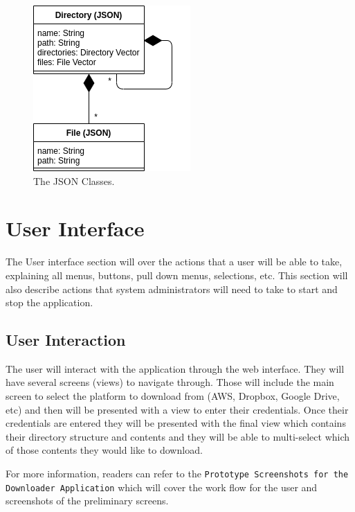 \documentclass{article}
\begin{document}
\begin{figure}[p]
\includegraphics[scale=.5]{des_json}
\centering
\caption{The JSON Classes.}
\end{figure}













\section{User Interface}
The User interface section will over the actions that a user will be able to take, explaining all menus, buttons,
pull down menus, selections, etc. This section will also describe actions that system administrators will need to
take to start and stop the application.

    \subsection{User Interaction}
    The user will interact with the application through the web interface. They will have several screens (views)
    to navigate through. Those will include the main screen to select the platform to download from (AWS, Dropbox,
    Google Drive, etc) and then will be presented with a view to enter their credentials. Once their credentials
    are entered they will be presented with the final view which contains their directory structure and contents
    and they will be able to multi-select which of those contents they would like to download.

    For more information, readers can refer to the \texttt{Prototype Screenshots for the Downloader Application}\cite{prot}
    which will cover the work flow for the user and screenshots of the preliminary screens.
    
\end{document}
